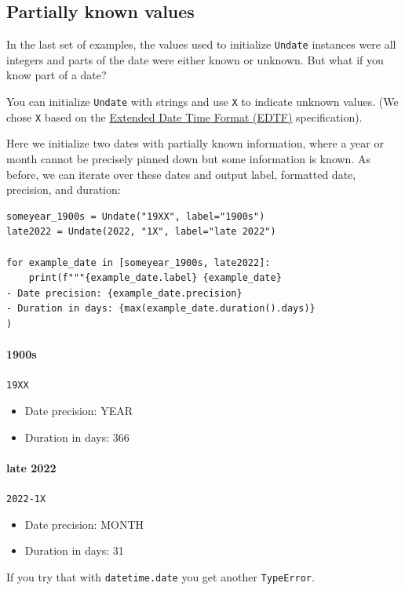 \documentclass{anthology-ch}         %
\begin{document}
\subsection{Partially known values}

In the last set of examples, the values used to initialize \texttt{Undate} instances were all integers and parts of the date were either known or unknown. But what if you know part of a
date?

You can initialize \texttt{Undate} with strings and use \texttt{X} to
indicate unknown values.  (We chose \texttt{X} based on the \href{https://www.loc.gov/standards/datetime/}{Extended Date Time Format (EDTF)} specification).

Here we initialize two dates with partially known information, where a year or month cannot be precisely pinned down but some information is known. As before, we can iterate over these dates
and output label, formatted date, precision, and duration:

\begin{verbatim}
someyear_1900s = Undate("19XX", label="1900s")
late2022 = Undate(2022, "1X", label="late 2022")

for example_date in [someyear_1900s, late2022]:
    print(f"""{example_date.label} {example_date}
- Date precision: {example_date.precision}
- Duration in days: {max(example_date.duration().days)}
)
\end{verbatim}

\paragraph{1900s} \texttt{19XX}
\begin{itemize}
    \item Date precision: YEAR
    \item Duration in days: 366
\end{itemize}
    
\paragraph{late 2022} \texttt{2022-1X}
\begin{itemize}
    \item Date precision: MONTH
    \item Duration in days: 31
\end{itemize}    

    
If you try that with \texttt{datetime.date} you get another \texttt{TypeError}.    
\end{document}
